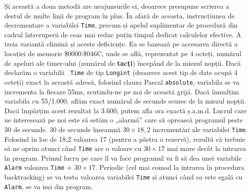 Și această a doua metodă are neajunsurile ei, deoarece presupune scrierea a
destul de multe linii de program în plus. În afară de aceasta, instrucțiunea
de decrementare a variabilei {\tt Time}, precum și apelul suplimentar de
procedură din cadrul întreruperii de ceas mai reduc puțin timpul dedicat
calculelor efective. A treia variantă elimină și aceste deficiențe. Ea se
bazează pe accesarea directă a locației de memorie \$0000:\$046C, unde se
află, reprezentat pe 4 octeți, numărul de apeluri ale timer-ului (numărul de
{\bf tacți}) începând de la miezul nopții. Dacă declarăm o variabilă {\tt
  Time} de tip {\tt Longint} (deoarece acest tip de date ocupă 4 octeți) exact
la această adresă, folosind clauza Pascal {\tt absolute}, variabila se va
incrementa la fiecare 55ms, scutindu-ne pe noi de această grijă. Dacă înmulțim
variabila cu 55/1.000, aflăm exact numărul de secunde scurse de la miezul
nopții. Dacă împărțim acest rezultat la 3.600, putem afla ora exactă
ș.a.m.d. Lucrul care ne interesează pe noi este să setăm o „alarmă” care să
oprească programul peste 30 de secunde. 30 de secunde înseamnă $30 \times
18,2$ incrementări ale variabilei {\tt Time}. Folosind în loc de 18,2 valoarea
17 (pentru a păstra o rezervă), rezultă că trebuie să ne oprim atunci când
{\tt Time} are o valoare cu $30 \times 17$ mai mare decât la intrarea în
program. Primul lucru pe care îl va face programul va fi să dea unei variabile
{\tt Alarm} valoarea {\tt Time} + $30 \times 17$. Periodic (cel mai comod la
intrarea în procedura backtracking) se va testa valoarea variabilei {\tt Time}
și atunci când ea este egală cu {\tt Alarm}, se va ieși din program.


